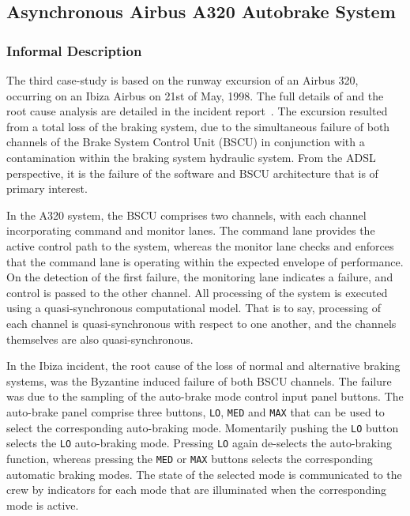 \subsection{Asynchronous  Airbus A320 Autobrake System}
\label{airbuscs}

\subsubsection{Informal Description}

The third  case-study is based on the runway excursion of an Airbus 320, occurring on
an Ibiza Airbus on 21st of May, 1998.  The full details of and the root cause
analysis are detailed in the incident report~\cite{a320ibiza}.  The excursion
resulted from a total loss of the braking system, due to the simultaneous
failure of  both channels of the Brake System Control Unit (BSCU) in conjunction
with a contamination within the braking system hydraulic system. From the ADSL
perspective, it is the failure of the software and BSCU architecture that is of
primary interest.


In the A320 system, the BSCU comprises two channels, with each channel incorporating command and monitor lanes.  The command lane provides the active
control path to the system, whereas the monitor lane checks and enforces that
the command lane is operating within the expected envelope of performance. On
the detection of the first failure, the monitoring lane indicates a failure, and
control is passed to the other channel.  All processing of the system is
executed using a quasi-synchronous computational model. That is to say,
processing of each channel is quasi-synchronous with respect to one another,
and the channels themselves are also quasi-synchronous.

In the Ibiza incident, the root cause of the loss of normal and alternative
braking systems, was the Byzantine induced failure of both BSCU channels. The
failure was due to the sampling of the auto-brake mode control input panel
buttons. The auto-brake panel comprise three buttons, \texttt{LO}, \texttt{MED} and \texttt{MAX} that can
be used to select the corresponding auto-braking mode.  Momentarily pushing the
\texttt{LO} button selects the \texttt{LO} auto-braking mode. Pressing \texttt{LO} again de-selects the
auto-braking function, whereas pressing the \texttt{MED} or \texttt{MAX} buttons  selects the
corresponding automatic braking  modes. The state of the selected mode is
communicated to the crew by indicators for each mode that are illuminated when
the corresponding mode is active.

